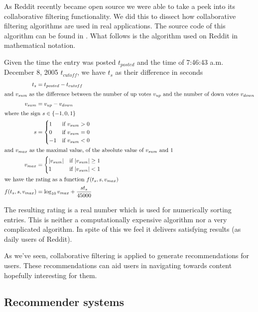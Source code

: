 As Reddit recently became open source%
we were able to take a peek into its
collaborative filtering functionality. We did this to dissect how
collaborative filtering algorithms are used in real applications. The source
code of this algorithm can be found in
.
What follows is the algorithm used on Reddit in mathematical notation.

Given the time the entry was posted $t_{posted}$ and
the time of 7:46:43 a.m. December 8, 2005 $t_{cutoff}$,
we have $t_s$ as their difference in seconds
\begin{align*}
  t_s &= t_{posted} - t_{cutoff} \\
  \intertext{and $v_{sum}$ as the difference between the number of up votes
             $v_{up}$ and the number of down votes $v_{down}$}
  v_{sum} &= v_{up} - v_{down} \\
  \intertext{where the sign $s \in \{-1, 0, 1\}$}
  s &= 
  \begin{cases} 
     1 & \text{if } v_{sum} > 0 \\
     0 & \text{if } v_{sum} = 0 \\
    -1 & \text{if } v_{sum} < 0
  \end{cases} \\
  \intertext{and $v_{max}$ as the maximal value,
             of the absolute value of $v_{sum}$ and $1$}
  v_{max} &= 
  \begin{cases} 
    |v_{sum}| & \text{if } |v_{sum}| \geq 1 \\
    1   & \text{if } |v_{sum}| < 1
  \end{cases} \\
  \intertext{we have the rating as a function $f(t_s, s, v_{max})$}
  f(t_s, s, v_{max}) &= \log_{10}{v_{max}} + \frac{st_s}{45000}
\end{align*}

The resulting rating is a real number which is used for numerically sorting
entries. This is neither a computationally expensive algorithm nor a very
complicated algorithm. In spite of this we feel it delivers satisfying results
(as daily users of Reddit).

\parabreak

As we've seen, collaborative filtering is applied to generate
recommendations for users. These recommendations can aid users in navigating
towards content hopefully interesting for them.

\subsection{Recommender systems}
\label{section:social.navigation.applied.forms.recommendations}

